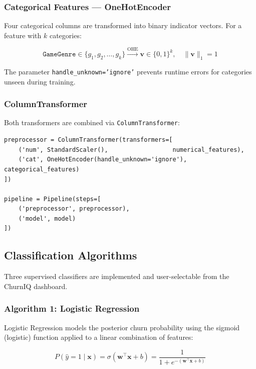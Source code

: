 \documentclass[12pt, a4paper]{article}
\begin{document}
\subsubsection{Categorical Features — OneHotEncoder}

Four categorical columns are transformed into binary indicator vectors.
For a feature with $k$ categories:

\begin{equation}
    \texttt{GameGenre} \in \{g_1, g_2, \ldots, g_k\}
    \xrightarrow{\text{OHE}} \mathbf{v} \in \{0,1\}^k,
    \quad \|\mathbf{v}\|_1 = 1
\end{equation}

The parameter \texttt{handle\_unknown='ignore'} prevents runtime errors
for categories unseen during training.

\subsubsection{ColumnTransformer}

Both transformers are combined via \texttt{ColumnTransformer}:

\begin{lstlisting}[caption={Full preprocessing pipeline — src/pipeline.py}, label={lst:pipe}]
preprocessor = ColumnTransformer(transformers=[
    ('num', StandardScaler(),                  numerical_features),
    ('cat', OneHotEncoder(handle_unknown='ignore'), categorical_features)
])

pipeline = Pipeline(steps=[
    ('preprocessor', preprocessor),
    ('model', model)
])
\end{lstlisting}

\subsection{Classification Algorithms}

Three supervised classifiers are implemented and user-selectable from the
ChurnIQ dashboard.

\subsubsection{Algorithm 1: Logistic Regression}

Logistic Regression models the posterior churn probability using the
sigmoid (logistic) function applied to a linear combination of features:

\begin{equation}
    P(\hat{y}=1 \mid \mathbf{x}) = \sigma\!\left(\mathbf{w}^\top \mathbf{x} + b\right)
    = \frac{1}{1 + e^{-(\mathbf{w}^\top \mathbf{x} + b)}}
\end{equation}
\end{document}
